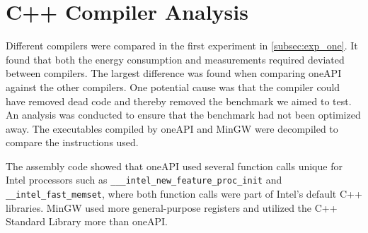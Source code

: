 \section{C++ Compiler Analysis}\label{app:compiler-analysis}

Different compilers were compared in the first experiment in \cref{subsec:exp_one}. It found that both the energy consumption and measurements required deviated between compilers. The largest difference was found when comparing oneAPI against the other compilers. One potential cause was that the compiler could have removed dead code and thereby removed the benchmark we aimed to test\cite{sestoft2013microbenchmarks}. An analysis was conducted to ensure that the benchmark had not been optimized away. The executables compiled by oneAPI and MinGW were decompiled to compare the instructions used.


The assembly code showed that oneAPI used several function calls unique for Intel processors such as \texttt{\_\_\_intel\_new\_feature\_proc\_init} and \texttt{\_\_intel\_fast\_memset}, where both function calls were part of Intel's default C++ libraries\cite{Intelassembly}. MinGW used more general-purpose registers and utilized the C++ Standard Library more than oneAPI.






